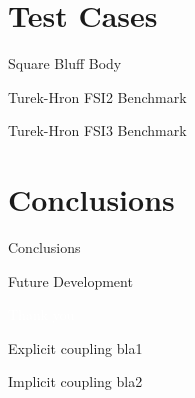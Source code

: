 \documentclass[10pt,t]{beamer}
\begin{document}
\section{Test Cases}

\begin{frame}{Square Bluff Body}

    
\end{frame}

\begin{frame}{Turek-Hron FSI2 Benchmark}

    
\end{frame}


\begin{frame}{Turek-Hron FSI3 Benchmark}

    
\end{frame}


\section{Conclusions}

\begin{frame}{Conclusions}
    
\end{frame}

\begin{frame}{Future Development}
    
\end{frame}

\begin{frame}[c,plain]{}
    \centering
    \textcolor{white}{Thank you}
\end{frame}

\begin{frame}{Explicit coupling}\label{couplingdetails}
  bla1  
\end{frame}


\begin{frame}{Implicit coupling}
  bla2
  \hyperlink{coupling}{\beamerreturnbutton{}}
\end{frame}


\end{document}
